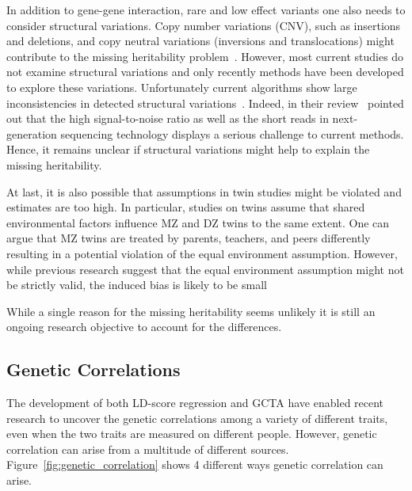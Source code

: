 In addition to gene-gene interaction, rare and low effect variants one also needs to consider structural variations.
Copy number variations (CNV), such as insertions and deletions, and copy neutral variations (inversions and translocations) might contribute to the missing heritability problem~\cite{Zarrei2015}.
However, most current studies do not examine structural variations and only recently methods have been developed to explore these variations.
Unfortunately current algorithms show large inconsistencies in detected structural variations~\cite{Pirooznia2015}.
Indeed, in their review~\citet{Li2013a} pointed out that the high signal-to-noise ratio as well as the short reads in next-generation sequencing technology displays a serious challenge to current methods.
Hence, it remains unclear if structural variations might help to explain the missing heritability.

At last, it is also possible that assumptions in twin studies might be violated and estimates are too high.
In particular, studies on twins assume that shared environmental factors influence MZ and DZ twins to the same extent.
One can argue that MZ twins are treated by parents, teachers, and peers differently resulting in a potential violation of the equal environment assumption. 
However, while previous research suggest that the equal environment assumption might not be strictly valid, the induced bias is likely to be small~\cite{Derks2006,Felson2014}

While a single reason for the missing heritability seems unlikely it is still an ongoing research objective to account for the differences.

\subsection{Genetic Correlations}
\label{sub:genetic_correlations_method}

The development of both LD-score regression and GCTA have enabled recent research to uncover the genetic correlations among a variety of different traits, even when the two traits are measured on different people.
However, genetic correlation can arise from a multitude of different sources.
Figure~\ref{fig:genetic_correlation} shows 4 different ways genetic correlation can arise.

